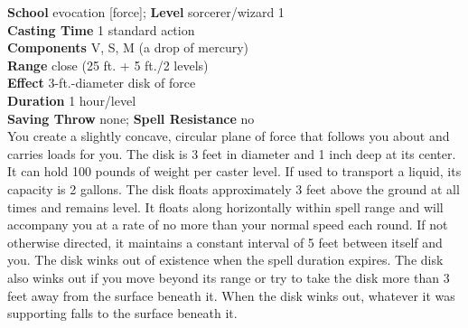 \textbf{School} evocation [force]; \textbf{Level} sorcerer/wizard 1\\
\textbf{Casting Time} 1 standard action\\
\textbf{Components} V, S, M (a drop of mercury)\\
\textbf{Range} close (25 ft. + 5 ft./2 levels)\\
\textbf{Effect} 3-ft.-diameter disk of force\\
\textbf{Duration} 1 hour/level\\
\textbf{Saving Throw} none; \textbf{Spell Resistance} no\\
You create a slightly concave, circular plane of force that follows you about and carries loads for you. The disk is 3 feet in diameter and 1 inch deep at its center. It can hold 100 pounds of weight per caster level. If used to transport a liquid, its capacity is 2 gallons. The disk floats approximately 3 feet above the ground at all times and remains level. It floats along horizontally within spell range and will accompany you at a rate of no more than your normal speed each round. If not otherwise directed, it maintains a constant interval of 5 feet between itself and you. The disk winks out of existence when the spell duration expires. The disk also winks out if you move beyond its range or try to take the disk more than 3 feet away from the surface beneath it. When the disk winks out, whatever it was supporting falls to the surface beneath it.\\
